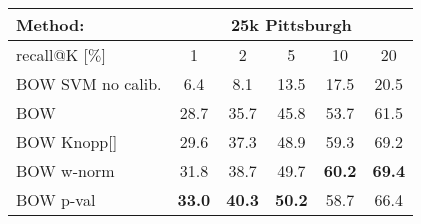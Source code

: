 
	\begin{tabularx}{0.915\linewidth}{|l|c c c c c|}
		\hline 
		\rowcolor{maroon!50}
		Method: & \multicolumn{5}{c|}{25k Pittsburgh} \\
		\hline 
		\hline 
		\rowcolor{maroon!50}
		recall@K [$\%$] & 1 & 2 & 5 & 10 & 20 \\
		\hline
		\rowcolor{maroon!10}
      \rowcolor{maroon!10}
    BOW SVM no calib.   & 6.4   & 8.1   & 13.5  & 17.5  & 20.5 \\
		  \rowcolor{maroon!10}
    BOW           & 28.7  & 35.7  & 45.8 & 53.7   & 61.5 \\
      \rowcolor{maroon!10}
    
    \textcolor{petr}{BOW  Knopp[]}  & \textcolor{petr}{29.6}  
                                    & \textcolor{petr}{37.3}  
                                    & \textcolor{petr}{48.9} 
                                    & \textcolor{petr}{59.3}   
                                    & \textcolor{petr}{69.2}  \\
      \rowcolor{maroon!10}
		BOW w-norm                      & 31.8    
                                    & 38.7  
                                    & 49.7  
                                    & \textbf{60.2}  
                                    & \textbf{69.4} \\
      \rowcolor{maroon!10}
    BOW p-val                       & \textbf{33.0}  
                                    & \textbf{40.3}  
                                    & \textbf{50.2} 
                                    & 58.7   
                                    & 66.4 \\
    \hline

\end{tabularx}
